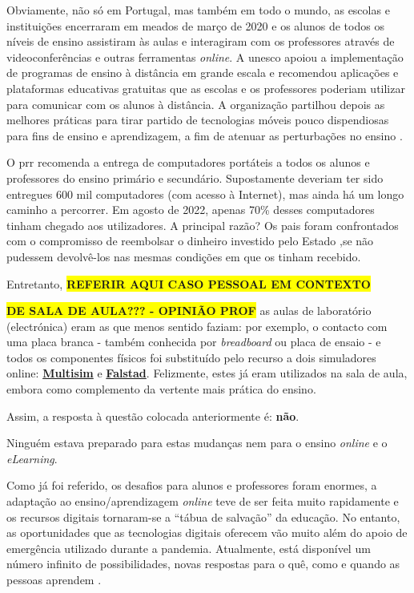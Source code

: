 Obviamente, não só em Portugal, mas também em todo o mundo, as escolas e instituições encerraram em meados de março de 2020 e os alunos de todos os níveis de ensino assistiram às aulas e interagiram com os professores através de videoconferências e outras ferramentas \textit{online}. A \acrfull{unesco} apoiou a implementação de programas de ensino à distância em grande escala e recomendou aplicações e plataformas educativas gratuitas que as escolas e os professores poderiam utilizar para comunicar com os alunos à distância. A organização partilhou depois as melhores práticas para tirar partido de tecnologias móveis pouco dispendiosas para fins de ensino e aprendizagem, a fim de atenuar as perturbações no ensino \cite{unesco}.

O \acrfull{prr} recomenda a entrega de computadores portáteis a todos os alunos e professores do ensino primário e secundário. Supostamente deveriam ter sido entregues 600 mil computadores (com acesso à Internet), mas ainda há um longo caminho a percorrer. Em agosto de 2022, apenas 70\% desses computadores tinham chegado aos utilizadores. A principal razão? Os pais foram confrontados com o compromisso de reembolsar o dinheiro investido pelo Estado ,se não pudessem devolvê-los nas mesmas condições em que os tinham recebido\cite{entregacomputadores}.

Entretanto, \colorbox{yellow}{\textbf{REFERIR AQUI CASO PESSOAL EM CONTEXTO }} 

\colorbox{yellow}{\textbf{DE SALA DE AULA??? - OPINIÃO PROF}} as aulas de laboratório (electrónica) eram as que menos sentido faziam: por exemplo, o contacto com uma placa branca - também conhecida por \textit{breadboard} ou placa de ensaio - e todos os componentes físicos foi substituído pelo recurso a dois simuladores online: \href{https://www.multisim.com/}{\textbf{Multisim}} e \href{https://www.falstad.com/circuit/}{\textbf{Falstad}}.
Felizmente, estes já eram utilizados na sala de aula, embora como complemento da vertente mais prática do ensino.

\vspace{1cm}
Assim, a resposta à questão colocada anteriormente é: \textbf{não}.
\vspace{1cm}

Ninguém estava preparado para estas mudanças nem para o ensino \textit{online} e o \textit{eLearning}.

Como já foi referido, os desafios para alunos e professores foram enormes, a adaptação ao ensino/aprendizagem \textit{online} teve de ser feita muito rapidamente e os recursos digitais tornaram-se a ``tábua de salvação'' da educação. No entanto, as oportunidades que as tecnologias digitais oferecem vão muito além do apoio de emergência utilizado durante a pandemia.
Atualmente, está disponível um número infinito de possibilidades, novas respostas para o quê, como e quando as pessoas aprendem \cite{oecd_state_2021}.

